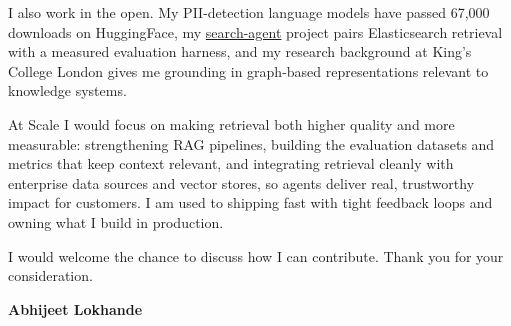 \documentclass[10pt,a4paper]{article}
\begin{document}
I also work in the open. My PII-detection language models have passed 67,000 downloads on HuggingFace, my \href{https://github.com/abhijeetscode/search-agent}{search-agent} project pairs Elasticsearch retrieval with a measured evaluation harness, and my research background at King's College London gives me grounding in graph-based representations relevant to knowledge systems.

At Scale I would focus on making retrieval both higher quality and more measurable: strengthening RAG pipelines, building the evaluation datasets and metrics that keep context relevant, and integrating retrieval cleanly with enterprise data sources and vector stores, so agents deliver real, trustworthy impact for customers. I am used to shipping fast with tight feedback loops and owning what I build in production.

I would welcome the chance to discuss how I can contribute. Thank you for your consideration.

\vspace{4pt}
{\color{company}\bfseries Abhijeet Lokhande}
\end{document}

